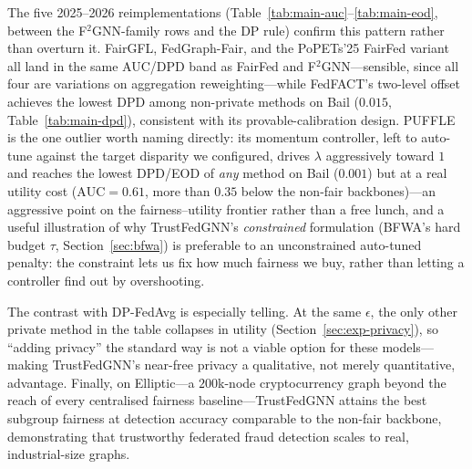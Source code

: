 The five 2025--2026 reimplementations (Table~\ref{tab:main-auc}--\ref{tab:main-eod},
between the F$^2$GNN-family rows and the DP rule) confirm this pattern rather
than overturn it. FairGFL, FedGraph-Fair, and the PoPETs'25 FairFed variant
all land in the same AUC/DPD band as FairFed and F$^2$GNN---sensible, since
all four are variations on aggregation reweighting---while FedFACT's two-level
offset achieves the lowest DPD among non-private methods on Bail ($0.015$,
Table~\ref{tab:main-dpd}), consistent with its provable-calibration design.
PUFFLE is the one outlier worth naming directly: its momentum controller, left
to auto-tune against the target disparity we configured, drives $\lambda$
aggressively toward $1$ and reaches the lowest DPD/EOD of \emph{any} method on
Bail ($0.001$) but at a real utility cost ($\mathrm{AUC}{=}0.61$, more than
$0.35$ below the non-fair backbones)---an aggressive point on the
fairness--utility frontier rather than a free lunch, and a useful illustration
of why TrustFedGNN's \emph{constrained} formulation (BFWA's hard budget $\tau$,
Section~\ref{sec:bfwa}) is preferable to an unconstrained auto-tuned penalty:
the constraint lets us fix how much fairness we buy, rather than letting a
controller find out by overshooting.

The contrast with DP-FedAvg is especially telling. At the same
$\epsilon$, the only other private method in the table collapses in utility
(Section~\ref{sec:exp-privacy}), so ``adding privacy'' the standard way is not a
viable option for these models---making TrustFedGNN's near-free privacy a
qualitative, not merely quantitative, advantage. Finally, on Elliptic---a
$200$k-node cryptocurrency graph beyond the reach of every centralised fairness
baseline---TrustFedGNN attains the best subgroup fairness at detection accuracy
comparable to the non-fair backbone, demonstrating that trustworthy federated
fraud detection scales to real, industrial-size graphs.

\begin{table}[t]\centering\small
\caption{Utility (AUC-ROC, higher is better). Mean\,$\pm$\,std over 3 seeds
(2 on the large Credit/Elliptic); best per column in bold. TrustFedGNN is the
only method that is fair \emph{and} private (methods above the rule are
non-private). $^{\ast}$FaVGNN is a horizontal adaptation of a vertical-FL
method. FairGFL/FedGraph-Fair/PUFFLE/FedFACT/PoPETs'25 are 2025--2026
reimplementations with approximated fidelity (Appendix~\ref{app:baselines}).}
\label{tab:main-auc}

\end{table}

